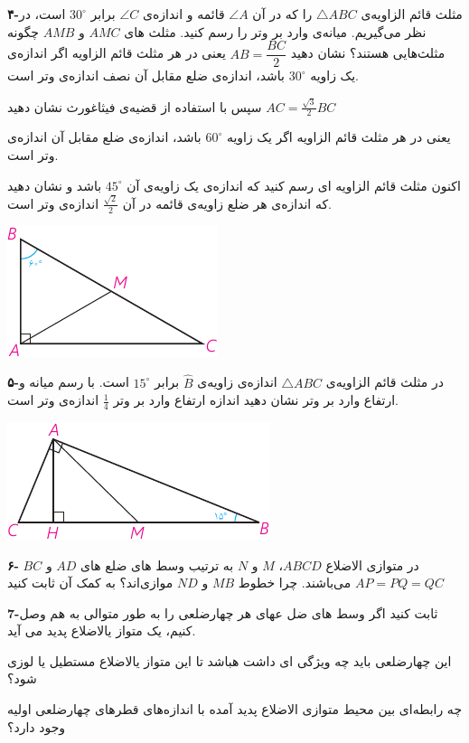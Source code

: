 \documentclass[12pt, a4paper, twoside]{book}
\begin{document}
\begin{multicols}{2}
			\bigskip
			\textbf{۴-}مثلث قائم الزاویه‌ی 
			$\triangle ABC$
			را که در آن 
			$\angle A$
			قائمه و اندازه‌ی
			$\angle C$
			برابر 
			$30^{\circ}$
			است، در نظر می‌گیریم. میانه‌ی وارد بر وتر را رسم کنید. مثلث های 
			$AMC$
			و
			$AMB$
			چگونه مثلث‌هایی هستند؟ نشان دهید 
			$AB = \dfrac{BC}{2}$
			یعنی در هر مثلث قائم الزاویه اگر اندازه‌ی یک زاویه 
			$30^{\circ}$
			باشد، اندازه‌ی ضلع مقابل آن نصف اندازه‌ی وتر است.
			
			سپس با استفاده از قضیه‌ی فیثاغورث نشان دهید
			$AC = \frac{\sqrt{3}}{2}BC$  
			
			یعنی در هر مثلث قائم الزاویه اگر یک زاویه 
			$60^{\circ}$
			باشد، اندازه‌ی ضلع مقابل آن  اندازه‌ی وتر است.
			
			اکنون مثلث قائم الزاویه ای رسم کنید که اندازه‌ی یک زاویه‌ی آن 
			$45^{\circ}$
			باشد و نشان دهید که اندازه‌ی هر ضلع زاویه‌ی قائمه در آن 
			$\frac{\sqrt{2}}{2}$
			اندازه‌ی وتر است.
			
\begin{center}
				\includegraphics{"Shapes/Fasl - 3/Dars 1/PDFs/P64-S1.pdf"}
\end{center}

			\bigskip
			\textbf{۵-}در مثلث قائم الزاویه‌ی 
			$\triangle ABC$
			اندازه‌ی زاویه‌ی 
			$\widehat{B}$
			برابر 
			$15^{\circ}$
			است. با رسم میانه و ارتفاع وارد بر وتر نشان دهید اندازه‌ ارتفاع وارد بر وتر 
			$\frac14$
			اندازه‌ی وتر است.
			
			\begin{center}
				\includegraphics{"Shapes/Fasl - 3/Dars 1/PDFs/P64-S2.pdf"}
			\end{center}
		
			\bigskip
			 \textbf{۶-} در متوازی الاضلاع  
			$ABCD$،
			$M$ و $N$
			به ترتیب وسط های ضلع های 
			$AD$ و $BC$
			می‌باشند. چرا خطوط
			$MB$ و $ND$
			موازی‌اند؟ به کمک آن ثابت کنید $AP = PQ = QC$
			
			\bigskip
			\textbf{7-}ثابت کنید اگر وسط های ضل عهای هر چهارضلعی را به طور متوالی به هم وصل کنیم، یک متواز یالاضلاع پدید می آید.
			
			این چهارضلعی باید چه ویژگی ای داشت هباشد تا این متواز یالاضلاع مستطیل یا لوزی شود؟
			
			چه رابطه‌ای بین محیط متوازی الاضلاع پدید آمده با اندازه‌های قطر‌های چهارضلعی اولیه وجود دارد؟
			
	\end{multicols}
\end{document}
